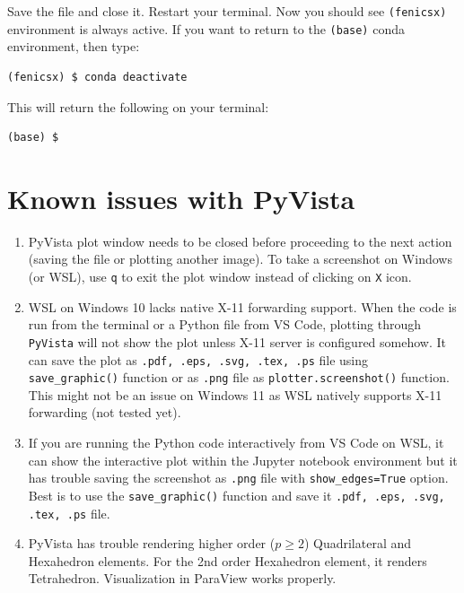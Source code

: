 \documentclass[12pt]{article}
\begin{document}
\begin{enumerate}[label={\arabic*.}, leftmargin= 0.6 cm,itemsep = 0.2cm,topsep=.2cm, parsep=0.2cm]
Save the file and close it. Restart your terminal. Now you should see \texttt{(fenicsx)} environment is always active. If you want to return to the \texttt{(base)} conda environment, then type:

\begin{lstlisting}[style=terminal]
(fenicsx) $ conda deactivate
\end{lstlisting}

This will return the following on your terminal:

\begin{lstlisting}[style=terminal]
(base) $
\end{lstlisting}

\end{enumerate}

\section*{Known issues with PyVista}

\begin{enumerate}[label={\arabic*.}, leftmargin= 0.6 cm,itemsep = 0.2cm,topsep=.2cm, parsep=0.2cm]

\item PyVista plot window needs to be closed before proceeding to the next action (saving the file or plotting another image). To take a screenshot on Windows (or WSL), use \texttt{q} to exit the plot window instead of clicking on \texttt{X} icon.

\item WSL on Windows 10 lacks native X-11 forwarding support. When the code is run from the terminal or a Python file from VS Code, plotting through \texttt{PyVista} will not show the plot unless X-11 server is configured somehow. It can save the plot as \texttt{.pdf, .eps, .svg, .tex, .ps} file using \texttt{save\_graphic()} function or as \texttt{.png} file as \texttt{plotter.screenshot()} function. This might not be an issue on Windows 11 as WSL natively supports X-11 forwarding (not tested yet).

\item If you are running the Python code interactively from VS Code on WSL, it can show the interactive plot within the Jupyter notebook environment but it has trouble saving the screenshot as \texttt{.png} file with \texttt{show\_edges=True} option. Best is to use the \texttt{save\_graphic()} function and save it \texttt{.pdf, .eps, .svg, .tex, .ps} file.

\item PyVista has trouble rendering higher order ($p \ge 2$) Quadrilateral and Hexahedron elements. For the 2nd order Hexahedron element, it renders Tetrahedron. Visualization in ParaView works properly.

\end{enumerate}
\end{document}
